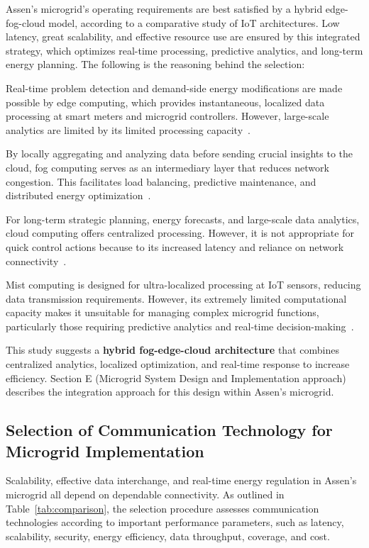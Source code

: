 \documentclass[conference]{IEEEtran}
\begin{document}
Assen's microgrid's operating requirements are best satisfied by a hybrid edge-fog-cloud model, according to a comparative study of IoT architectures. Low latency, great scalability, and effective resource use are ensured by this integrated strategy, which optimizes real-time processing, predictive analytics, and long-term energy planning. The following is the reasoning behind the selection:

Real-time problem detection and demand-side energy modifications are made possible by edge computing, which provides instantaneous, localized data processing at smart meters and microgrid controllers. However, large-scale analytics are limited by its limited processing capacity~\cite{9584756}.

By locally aggregating and analyzing data before sending crucial insights to the cloud, fog computing serves as an intermediary layer that reduces network congestion. This facilitates load balancing, predictive maintenance, and distributed energy optimization~\cite{9257923}.

For long-term strategic planning, energy forecasts, and large-scale data analytics, cloud computing offers centralized processing. However, it is not appropriate for quick control actions because to its increased latency and reliance on network connectivity~\cite{9823928}.

Mist computing is designed for ultra-localized processing at IoT sensors, reducing data transmission requirements. However, its extremely limited computational capacity makes it unsuitable for managing complex microgrid functions, particularly those requiring predictive analytics and real-time decision-making~\cite{CloudFogMist2021}.  

This study suggests a \textbf{hybrid fog-edge-cloud architecture} that combines centralized analytics, localized optimization, and real-time response to increase efficiency. Section E (Microgrid System Design and Implementation approach) describes the integration approach for this design within Assen's microgrid.

\subsection{Selection of Communication Technology for Microgrid Implementation}

Scalability, effective data interchange, and real-time energy regulation in Assen's microgrid all depend on dependable connectivity. As outlined in Table~\ref{tab:comparison}, the selection procedure assesses communication technologies according to important performance parameters, such as latency, scalability, security, energy efficiency, data throughput, coverage, and cost.
\end{document}
